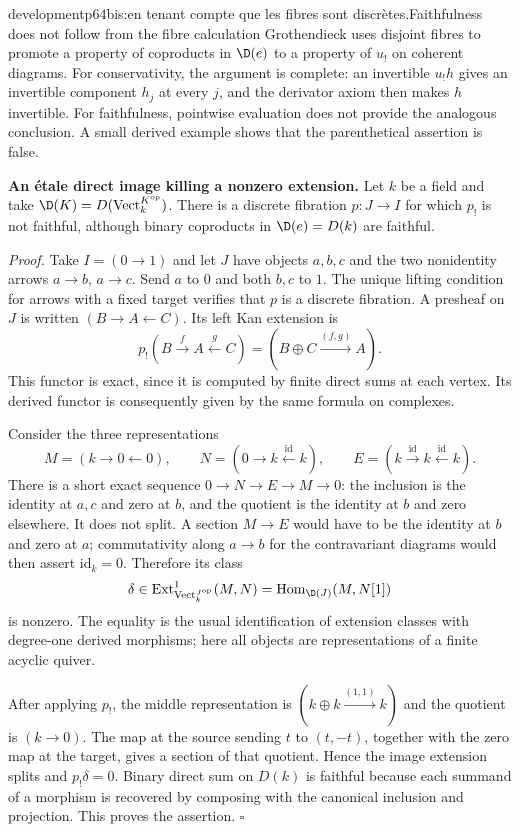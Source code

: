 \begin{dcomment}{development}{p64bis:en tenant compte que les fibres sont discrètes.}{Faithfulness does not follow from the fibre calculation}
Grothendieck uses disjoint fibres to promote a property of coproducts in $\D(e)$ to a property of $u_!$ on coherent diagrams. For conservativity, the argument is complete: an invertible $u_!h$ gives an invertible component $h_j$ at every $j$, and the derivator axiom then makes $h$ invertible. For faithfulness, pointwise evaluation does not provide the analogous conclusion. A small derived example shows that the parenthetical assertion is false.

\textbf{An étale direct image killing a nonzero extension.}\ours{}
Let $k$ be a field and take $\D(K)=D(\operatorname{Vect}_k^{K^{\mathrm{op}}})$. There is a discrete fibration $p:J\to I$ for which $p_!$ is not faithful, although binary coproducts in $\D(e)=D(k)$ are faithful.

\emph{Proof.} Take $I=(0\to1)$ and let $J$ have objects $a,b,c$ and the two nonidentity arrows $a\to b$, $a\to c$. Send $a$ to $0$ and both $b,c$ to $1$. The unique lifting condition for arrows with a fixed target verifies that $p$ is a discrete fibration. A presheaf on $J$ is written $(B\to A\leftarrow C)$. Its left Kan extension is
\[
       p_!(B\xrightarrow{f}A\xleftarrow{g}C)
       =(B\oplus C\xrightarrow{(f,g)}A).
\]
This functor is exact, since it is computed by finite direct sums at each vertex. Its derived functor is consequently given by the same formula on complexes.

Consider the three representations
\[
 M=(k\to0\leftarrow0),\qquad
 N=(0\to k\xleftarrow{\mathrm{id}}k),\qquad
 E=(k\xrightarrow{\mathrm{id}}k\xleftarrow{\mathrm{id}}k).
\]
There is a short exact sequence $0\to N\to E\to M\to0$: the inclusion is the identity at $a,c$ and zero at $b$, and the quotient is the identity at $b$ and zero elsewhere. It does not split. A section $M\to E$ would have to be the identity at $b$ and zero at $a$; commutativity along $a\to b$ for the contravariant diagrams would then assert $\mathrm{id}_k=0$. Therefore its class
\[
       \delta\in\operatorname{Ext}^1_{\operatorname{Vect}_k^{J^{\mathrm{op}}}}(M,N)
       =\operatorname{Hom}_{\D(J)}(M,N[1])
\]
is nonzero. The equality is the usual identification of extension classes with degree-one derived morphisms; here all objects are representations of a finite acyclic quiver.

After applying $p_!$, the middle representation is $(k\oplus k\xrightarrow{(1,1)}k)$ and the quotient is $(k\to0)$. The map at the source sending $t$ to $(t,-t)$, together with the zero map at the target, gives a section of that quotient. Hence the image extension splits and $p_!\delta=0$. Binary direct sum on $D(k)$ is faithful because each summand of a morphism is recovered by composing with the canonical inclusion and projection. This proves the assertion. \hfill$\square$


\end{dcomment}
